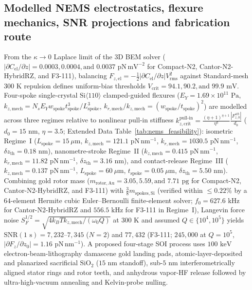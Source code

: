 \documentclass[11pt, a4paper]{article}
\begin{document}
\subsection*{Modelled NEMS electrostatics, flexure mechanics, SNR projections and fabrication route}
From the $\kappa \to 0$ Laplace limit of the 3D BEM solver ($|\partial C_{\mathrm{el}}/\partial z| = 0.0003, 0.0004, \text{and }0.0037\text{ pN}\,\text{mV}^{-2}$ for Compact-N2, Cantor-N2-HybridRZ, and F3-111), balancing $F_{z,\mathrm{el}} = -\frac{1}{2}|\partial C_{\mathrm{el}}/\partial z|V_{\mathrm{rms}}^2$ against Standard-mesh $300\text{ K}$ repulsion defines uniform-bias thresholds $V_{\mathrm{crit}} = 94.1, 90.2, \text{and }99.9\text{ mV}$. Four-spoke single-crystal $\mathrm{Si}\langle 110\rangle$ clamped-guided flexures ($E_Y = 1.69\times 10^{11}\text{ Pa}$, $k_{z,\mathrm{mech}} = N_s E_Y w_{\mathrm{spoke}} t_{\mathrm{spoke}}^3/L_{\mathrm{spoke}}^3$, $k_{r,\mathrm{mech}}/k_{z,\mathrm{mech}} = (w_{\mathrm{spoke}}/t_{\mathrm{spoke}})^2$) are modelled across three regimes relative to nonlinear pull-in stiffness $k_{z,\mathrm{crit}}^{\mathrm{pull\text{-}in}} = \frac{(\eta+1)^{\eta+1}}{\eta^\eta}\frac{|F_{z,0}^{\mathrm{att}}|}{d_0}$ ($d_0 = 15\text{ nm}$, $\eta = 3.5$; Extended Data Table~\ref{tab:nems_feasibility}): isometric Regime~I ($L_{\mathrm{spoke}} = 15\ \mu\text{m}$, $k_{z,\mathrm{mech}} = 121.1\text{ pN}\,\text{nm}^{-1}$, $k_{r,\mathrm{mech}} = 1030.5\text{ pN}\,\text{nm}^{-1}$, $\delta z_{\mathrm{th}} = 0.18\text{ nm}$), nanometre-stroke Regime~II ($k_{z,\mathrm{mech}} = 0.415\text{ pN}\,\text{nm}^{-1}$, $k_{r,\mathrm{mech}} = 11.82\text{ pN}\,\text{nm}^{-1}$, $\delta z_{\mathrm{th}} = 3.16\text{ nm}$), and contact-release Regime~III ($k_{z,\mathrm{mech}} = 0.137\text{ pN}\,\text{nm}^{-1}$, $L_{\mathrm{spoke}} = 60\ \mu\text{m}$, $t_{\mathrm{spoke}} = 0.05\ \mu\text{m}$, $\delta z_{\mathrm{th}} = 5.50\text{ nm}$). Combining gold rotor mass ($m_{\mathrm{rotor,Au}} = 3.05, 5.59, \text{and }7.71\text{ pg}$ for Compact-N2, Cantor-N2-HybridRZ, and F3-111) with $\frac{3}{8}m_{\mathrm{spokes,Si}}$ (verified within $\le 0.22\%$ by a $64$-element Hermite cubic Euler--Bernoulli finite-element solver; $f_0 = 627.6\text{ kHz}$ for Cantor-N2-HybridRZ and $556.5\text{ kHz}$ for F3-111 in Regime~I), Langevin force noise $S_F^{1/2} = \sqrt{4 k_B T k_{z,\mathrm{mech}}/(\omega_0 Q)}$ at $300\text{ K}$ and assumed $Q \in \{10^4, 10^5\}$ yields $\mathrm{SNR}(1\text{ s}) = 7{,}232\text{--}7{,}345$ ($N=2$) and $77{,}432$ (F3-111; $245{,}000$ at $Q=10^5$, $|\partial F_z/\partial z_0| = 1.16\text{ pN}\,\text{nm}^{-1}$). A proposed four-stage SOI process uses $100\text{ keV}$ electron-beam-lithography damascene gold landing pads, atomic-layer-deposited and planarized sacrificial $\mathrm{SiO}_2$ ($15\text{ nm}$ standoff), sub-$5\text{ nm}$ interferometrically aligned stator rings and rotor teeth, and anhydrous vapor-HF release followed by ultra-high-vacuum annealing and Kelvin-probe nulling.
\end{document}
